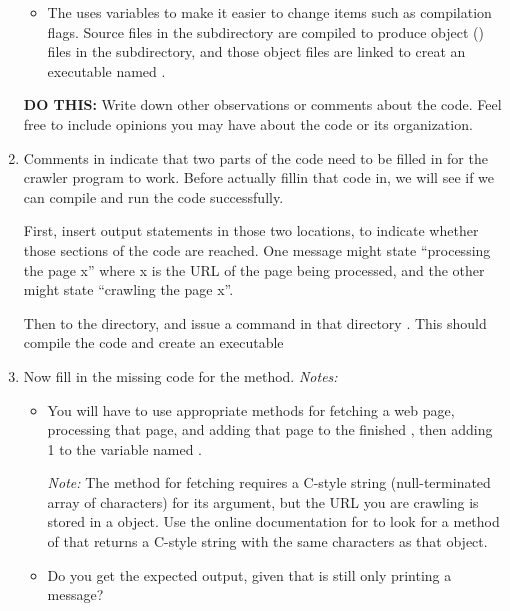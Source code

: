 \documentclass[letterpaper,10pt,openany,oneside]{sphinxmanual}
\begin{document}
\begin{enumerate}
\begin{itemize}
\item {} 
The  uses  variables to make it easier to
change items such as compilation flags. Source files in the
 subdirectory are compiled to produce object () files
in the  subdirectory, and those object files are linked
to creat an executable named .

\end{itemize}

\textbf{DO THIS:} Write down other observations or comments about the
 code. Feel free to include opinions you may have about the
code or its organization.

\item {} 
Comments in  indicate that two parts of the code need
to be filled in for the crawler program to work. Before actually
fillin that code in, we will see if we can compile and run the code
successfully.

First, insert output statements in those two locations, to indicate
whether those sections of the code are reached. One message might
state ``processing the page x'' where x is the URL of the page being
processed, and the other might state ``crawling the page x''.

Then  to the  directory, and issue a  command
in that directory . This should compile the code and create
an executable 

\item {} 
Now fill in the missing code for the  method.
\emph{Notes:}
\begin{itemize}
\item {} 
You will have to use appropriate methods for fetching a web page,
processing that page, and adding that page to the finished
, then adding 1 to the variable named .

\emph{Note:} The method for fetching requires a C-style string
(null-terminated array of characters) for its argument, but the
URL you are crawling is stored in a  object. Use the
online documentation for  to look for a method of
 that returns a C-style string with the same characters
as that  object.

\item {} 
Do you get the expected output, given that 
is still only printing a message?


\end{itemize}
\end{enumerate}
\end{document}
